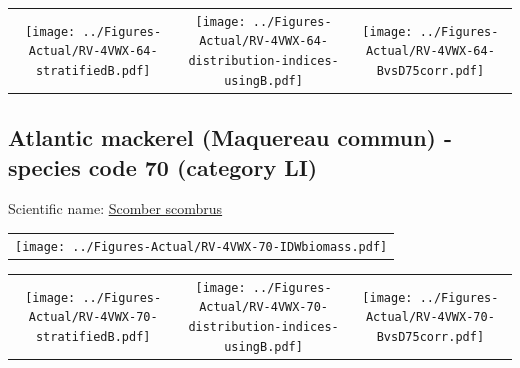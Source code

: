 \documentclass[12pt]{article}\usepackage[]{graphicx}\usepackage[]{color}
\begin{document}
\vspace{1cm}
\begin{minipage}{1.0\textwidth}
 \begin{tabular}{ccc}
\texttt{[image: ../Figures-Actual/RV-4VWX-64-stratifiedB.pdf]} & 
\texttt{[image: ../Figures-Actual/RV-4VWX-64-distribution-indices-usingB.pdf]} & 
\texttt{[image: ../Figures-Actual/RV-4VWX-64-BvsD75corr.pdf]} \\ 
\end{tabular} 
\end{minipage}
\clearpage

\renewcommand\thefigure{\thesubsection\Alph{figure}}

\setcounter{figure}{0}

\hypertarget{sec:70}{%
\subsection{Atlantic mackerel (Maquereau commun) - species code 70 (category LI)}\label{sec:70}}

  


Scientific name: \href{http://www.marinespecies.org/aphia.php?p=taxdetails\&id=127023}{Scomber scombrus} \newline
\begin{minipage}{1.0\textwidth}
 \begin{tabular}{c}
\texttt{[image: ../Figures-Actual/RV-4VWX-70-IDWbiomass.pdf]} \\ 
\end{tabular} 
\end{minipage}
\newline

\vspace{1cm}
\begin{minipage}{1.0\textwidth}
 \begin{tabular}{ccc}
\texttt{[image: ../Figures-Actual/RV-4VWX-70-stratifiedB.pdf]} & 
\texttt{[image: ../Figures-Actual/RV-4VWX-70-distribution-indices-usingB.pdf]} & 
\texttt{[image: ../Figures-Actual/RV-4VWX-70-BvsD75corr.pdf]} \\ 
\end{tabular} 
\end{minipage}
\clearpage
\end{document}
